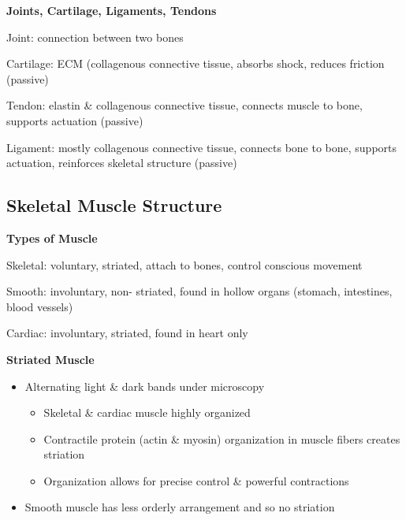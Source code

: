 \documentclass[11pt,fleqn]{book} %
\begin{document}
\textbf{Joints, Cartilage, Ligaments, Tendons}
\begin{descriptions}
    \item[Joint: ]connection between two bones
    \item[Cartilage: ]ECM (collagenous connective tissue, absorbs shock, reduces friction (passive)
    \item[Tendon: ]elastin \& collagenous
connective tissue, connects muscle
to bone, supports actuation
(passive) 
    \item[Ligament: ]mostly collagenous
connective tissue, connects bone
to bone, supports actuation,
reinforces skeletal structure
(passive) 
\end{descriptions}

\subsection{Skeletal Muscle Structure}
\textbf{Types of Muscle}
\begin{descriptions}
    \item[Skeletal: ]voluntary, striated,
attach to bones, control
conscious movement
    \item[Smooth: ]involuntary, non-
striated, found in hollow organs
(stomach, intestines, blood
vessels) 
    \item[Cardiac: ]involuntary, striated,
found in heart only
\end{descriptions}

\textbf{Striated Muscle}
\begin{itemize}
    \item Alternating light \& dark bands under microscopy
    \begin{itemize}
        \item Skeletal \& cardiac muscle highly organized
        \item Contractile protein (actin \& myosin) organization in
muscle fibers creates striation
        \item Organization allows for precise control \& powerful
contractions
    \end{itemize}
    \item Smooth muscle has less orderly arrangement and
so no striation
\end{itemize}
\end{document}
